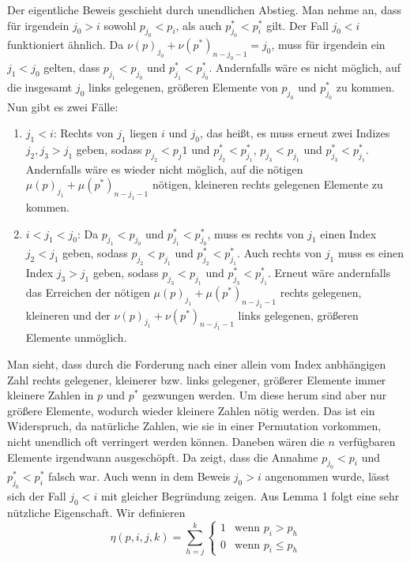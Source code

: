 \documentclass[a4paper, 11pt, ngerman]{article}
\begin{document}
Der eigentliche Beweis geschieht durch unendlichen Abstieg. Man nehme an, dass für irgendein $j_0 > i$ sowohl $p_{j_0} < p_i$, als auch $p^*_{j_0} < p^*_i$ gilt. Der Fall $j_0 < i$ funktioniert ähnlich. Da $\nu(p)_{j_0} + \nu(p^*)_{n - j_0 - 1} = j_0$, muss für irgendein ein $j_1 < j_0$ gelten, dass $p_{j_1} < p_{j_0}$ und $p^*_{j_1} < p^*_{j_0}$. Andernfalls wäre es nicht möglich, auf die insgesamt $j_0$ links gelegenen, größeren Elemente von $p_{j_0}$ und $p^*_{j_0}$ zu kommen. Nun gibt es zwei Fälle:
\begin{enumerate}
    \item $j_1 < i$: Rechts von $j_1$ liegen $i$ und $j_0$, das heißt, es muss erneut zwei Indizes $j_2, j_3 > j_1$ geben, sodass $p_{j_2} < p_j1$ und $p^*_{j_2} < p^*_{j_1}$, $p_{j_3} < p_{j_1}$ und $p^*_{j_3} < p^*_{j_1}$. Andernfalls wäre es wieder nicht möglich, auf die nötigen $\mu(p)_{j_1} + \mu(p^*)_{n - j_1 - 1}$ nötigen, kleineren rechts gelegenen Elemente zu kommen.
    \item $i < j_1 < j_0$: Da $p_{j_1} < p_{j_0}$ und $p^*_{j_1} < p^*_{j_0}$, muss es rechts von $j_1$ einen Index $j_2 < j_1$ geben, sodass $p_{j_2} < p_{j_1}$ und $p^*_{j_2} < p^*_{j_1}$. Auch rechts von $j_1$ muss es einen Index $j_3 > j_1$ geben, sodass $p_{j_3} < p_{j_1}$ und $p^*_{j_3} < p^*_{j_1}$. Erneut wäre andernfalls das Erreichen der nötigen $\mu(p)_{j_1} + \mu(p^*)_{n - j_1 - 1}$ rechts gelegenen, kleineren und der $\nu(p)_{j_1} + \nu(p^*)_{n - j_1 - 1}$ links gelegenen, größeren Elemente unmöglich.
\end{enumerate}
Man sieht, dass durch die Forderung nach einer allein vom Index anbhängigen Zahl rechts gelegener, kleinerer bzw. links gelegener, größerer Elemente immer kleinere Zahlen in $p$ und $p^*$ gezwungen werden. Um diese herum sind aber nur größere Elemente, wodurch wieder kleinere Zahlen nötig werden. Das ist ein Widerspruch, da natürliche Zahlen, wie sie in einer Permutation vorkommen, nicht unendlich oft verringert werden können. Daneben wären die $n$ verfügbaren Elemente irgendwann ausgeschöpft. Da zeigt, dass die Annahme $p_{j_0} < p_i$ und $p^*_{j_0} < p^*_i$ falsch war. Auch wenn in dem Beweis $j_0 > i$ angenommen wurde, lässt sich der Fall $j_0 < i$ mit gleicher Begründung zeigen.
\newline \newline
Aus Lemma 1 folgt eine sehr nützliche Eigenschaft. Wir definieren
$$
    \eta(p, i, j, k) = \sum_{h = j}^k \begin{cases}
        1 & \text{wenn } p_i > p_h   \\
        0 & \text{wenn } p_i \le p_h
    \end{cases}
$$
\end{document}
